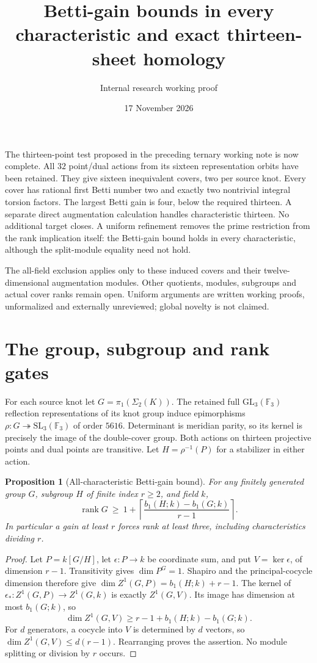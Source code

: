 \documentclass[11pt]{article}
\title{Betti-gain bounds in every characteristic and exact thirteen-sheet homology}
\author{Internal research working proof}
\date{17 November 2026}
\newtheorem{proposition}{Proposition}
\newcommand{\F}{\mathbb F}
\newcommand{\rank}{\operatorname{rank}}
\begin{document}
\maketitle

The thirteen-point test proposed in the preceding ternary
working note is now complete. All $32$ point/dual actions
from its sixteen representation orbits have been retained.
They give sixteen inequivalent covers, two per source knot.
Every cover has rational first Betti number two and exactly
two nontrivial integral torsion factors. The largest Betti
gain is four, below the required thirteen. A separate direct
augmentation calculation handles characteristic thirteen.
No additional target closes. A uniform refinement removes
the prime restriction from the rank implication itself:
the Betti-gain bound holds in every characteristic, although
the split-module equality need not hold.

The all-field exclusion applies only to these induced covers
and their twelve-dimensional augmentation modules. Other
quotients, modules, subgroups and actual cover ranks remain
open. Uniform arguments are written working proofs,
unformalized and externally unreviewed; global novelty is
not claimed.

\section{The group, subgroup and rank gates}

For each source knot let $G=\pi_1(\Sigma_2(K))$. The retained
full $\mathrm{GL}_3(\F_3)$ reflection representations of its
knot group induce epimorphisms
$\rho:G\twoheadrightarrow\mathrm{SL}_3(\F_3)$ of order $5616$.
Determinant is meridian parity, so its kernel is precisely
the image of the double-cover group. Both actions on thirteen
projective points and dual points are transitive. Let
$H=\rho^{-1}(P)$ for a stabilizer in either action.

\begin{proposition}[All-characteristic Betti-gain bound]
For any finitely generated group $G$, subgroup $H$ of finite
index $r\ge2$, and field $k$,
\[
 \rank G\ \ge\ 1+\left\lceil
       \frac{b_1(H;k)-b_1(G;k)}{r-1}\right\rceil.
\]
In particular a gain at least $r$ forces rank at least three,
including characteristics dividing $r$.
\end{proposition}
\begin{proof}
Let $P=k[G/H]$, let $\epsilon:P\to k$ be coordinate sum,
and put $V=\ker\epsilon$, of dimension $r-1$. Transitivity
gives $\dim P^G=1$. Shapiro and the principal-cocycle
dimension therefore give
$\dim Z^1(G,P)=b_1(H;k)+r-1$. The kernel of
$\epsilon_*:Z^1(G,P)\to Z^1(G,k)$ is exactly $Z^1(G,V)$.
Its image has dimension at most $b_1(G;k)$, so
\[
 \dim Z^1(G,V)\ge r-1+b_1(H;k)-b_1(G;k).
\]
For $d$ generators, a cocycle into $V$ is determined by $d$
vectors, so $\dim Z^1(G,V)\le d(r-1)$. Rearranging proves
the assertion. No module splitting or division by $r$ occurs.
\end{proof}
\end{document}
